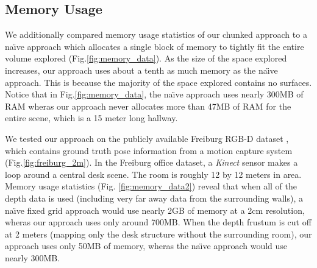 \documentclass[10pt,twocolumn,letterpaper]{article}
\newcommand{\figref}[1]{Fig.\ref{#1}}
\begin{document}
\subsection{Memory Usage}
\label{sec:memory}
We additionally compared memory usage statistics of our chunked approach to a
na\"{\i}ve approach which allocates a single block of memory to tightly fit the
entire volume explored (\figref{fig:memory_data}). As the size of the space
explored increases, our approach uses about a tenth as much memory as the
na\"{\i}ve approach. This is because the majority of the space explored contains no
surfaces. Notice that in \figref{fig:memory_data}, the na\"{\i}ve approach uses
nearly 300MB of RAM wheras our approach never allocates more than 47MB of RAM
for the entire scene, which is a 15 meter long hallway.

We tested our approach on the publicly available Freiburg RGB-D dataset
\cite{FREIBURG}, which contains ground truth pose information from a motion
capture system (\figref{fig:freiburg_2m}). In the Freiburg office dataset, a
\textit{Kinect} sensor makes a loop around a central desk scene. The room is
roughly 12 by 12 meters in area.  Memory usage statistics (Fig.
\ref{fig:memory_data2}) reveal that when all of the depth data is used
(including very far away data from the surrounding walls), a na\"{\i}ve fixed grid
approach would use nearly 2GB of memory at a 2cm resolution, wheras our
approach uses only around 700MB. When the depth frustum is cut off at 2 meters
(mapping only the desk structure without the surrounding room), our approach
uses only 50MB of memory, wheras the na\"{\i}ve approach would use nearly 300MB.
\end{document}
